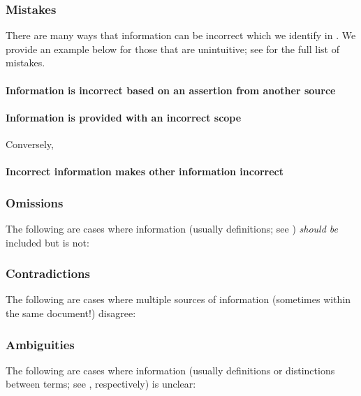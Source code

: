 \subsubsection{Mistakes}\label{wrong}

There are many ways that information can be incorrect which we identify
in . We provide an example below for those that are
unintuitive\ifnotpaper; see  for the full list of mistakes\fi.



\paragraph{Information is incorrect based on an assertion from another source}
\errorGuessFlaw{}

\paragraph{Information is provided with an incorrect scope}
\parSheetTestFlaw{} Conversely, \tolTestFlaw*{}

\paragraph{Incorrect information makes other information incorrect}
\redBoxFlaw{}

\subsubsection{Omissions}\label{miss}
The following are cases where information (usually definitions; see )
\emph{should be} included but is not:



\subsubsection{Contradictions}\label{contra}
The following are cases where multiple sources of information (sometimes within
the same document!) disagree:



\subsubsection{Ambiguities}\label{ambi}
The following are cases where information (usually definitions or distinctions
between terms; see , respectively) is unclear:

